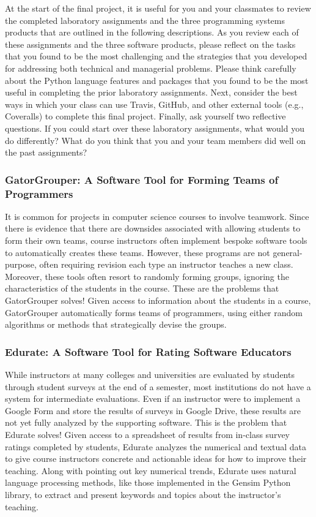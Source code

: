 \documentclass[11pt]{article}
\begin{document}
At the start of the final project, it is useful for you and your classmates to review the completed laboratory
assignments and the three programming systems products that are outlined in the following descriptions. As you review
each of these assignments and the three software products, please reflect on the tasks that you found to be the most
challenging and the strategies that you developed for addressing both technical and managerial problems. Please think
carefully about the Python language features and packages that you found to be the most useful in completing the prior
laboratory assignments. Next, consider the best ways in which your class can use Travis, GitHub, and other external
tools (e.g., Coveralls) to complete this final project. Finally, ask yourself two reflective questions. If you could
start over these laboratory assignments, what would you do differently? What do you think that you and your team members
did well on the past assignments?

\subsubsection*{GatorGrouper: A Software Tool for Forming Teams of Programmers}

It is common for projects in computer science courses to involve teamwork. Since there is evidence that there are
downsides associated with allowing students to form their own teams, course instructors often implement bespoke software
tools to automatically creates these teams. However, these programs are not general-purpose, often requiring revision each
type an instructor teaches a new class. Moreover, these tools often resort to randomly forming groups, ignoring the
characteristics of the students in the course. These are the problems that GatorGrouper solves! Given access to
information about the students in a course, GatorGrouper automatically forms teams of programmers, using either random
algorithms or methods that strategically devise the groups.

\subsubsection*{Edurate: A Software Tool for Rating Software Educators}

While instructors at many colleges and universities are evaluated by students through student surveys at the end of a
semester, most institutions do not have a system for intermediate evaluations. Even if an instructor were to implement a
Google Form and store the results of surveys in Google Drive, these results are not yet fully analyzed by the supporting
software. This is the problem that Edurate solves! Given access to a spreadsheet of results from in-class survey ratings
completed by students, Edurate analyzes the numerical and textual data to give course instructors concrete and
actionable ideas for how to improve their teaching. Along with pointing out key numerical trends, Edurate uses natural
language processing methods, like those implemented in the Gensim Python library, to extract and present keywords and
topics about the instructor's teaching.
\end{document}

